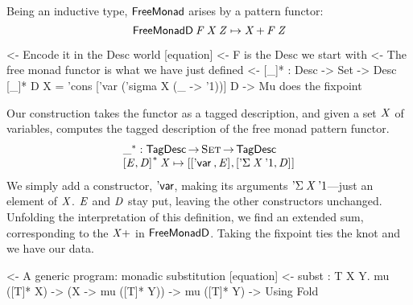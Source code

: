 Being an inductive type, $\FMFreeMonad$ arises
by a pattern functor:
%
\[
\FMFreeMonadD\: \V{F}\: \V{X}\: \V{Z} \mapsto \V{X} \mathop{\D{+}} \V{F}\:\V{Z}
\]

\begin{wstructure}
    <- Encode it in the Desc world [equation]
        <- F is the Desc we start with
        <- The free monad functor is what we have just defined
        <- [\_]* : Desc -> Set -> Desc
           [\_]* D X = 'cons ['var ('sigma X (\_ -> '1))] D
        -> Mu does the fixpoint
\end{wstructure}

Our construction takes the functor as a
tagged description, and given a set $\V{X}$ of variables, computes the
tagged description of the free monad pattern functor.
%
\[\stk{
\FreeMonad{\_} : \TagDesc \To \Set \To \TagDesc \\
\FreeMonad{\pair{\V{E}}{\V{D}}{}}\:\V{X} \mapsto
    \pair{\pair{\DVar{}}{\V{E}}{}}
         {\pair{\DSigma{\V{X}}{\DUnit}}{\V{D}}{}}{}
}\]
%
We simply add a constructor, $\SYMBDVar$, making its arguments
$\DSigma{\V{X}}{\DUnit}$---just an element of $\V{X}$. 
$\V{E}$ and $\V{D}$ stay put, leaving the other constructors
unchanged. Unfolding the interpretation of this definition, we
find an extended sum, corresponding to the \(\V{X}\D{+}\) in
$\FMFreeMonadD$. Taking the fixpoint ties the knot and we have our
data.

\begin{wstructure}
<- A generic program: monadic substitution [equation]
    <- subst : \forall T X Y. mu ([T]* X) -> (X -> mu ([T]* Y)) -> mu ([T]* Y)
        -> Using Fold
\end{wstructure}

\newcommand{\subst}{\F{subst}}
\newcommand{\apply}{\F{apply}}

